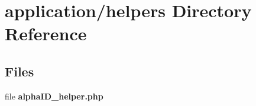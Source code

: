 \section{application/helpers Directory Reference}
\label{dir_fadd79e5a69fd26f510f8efb031e13e1}
\subsection*{Files}
\begin{DoxyCompactItemize}
\item 
file {\bf alpha\-I\-D\-\_\-helper.\-php}
\end{DoxyCompactItemize}
